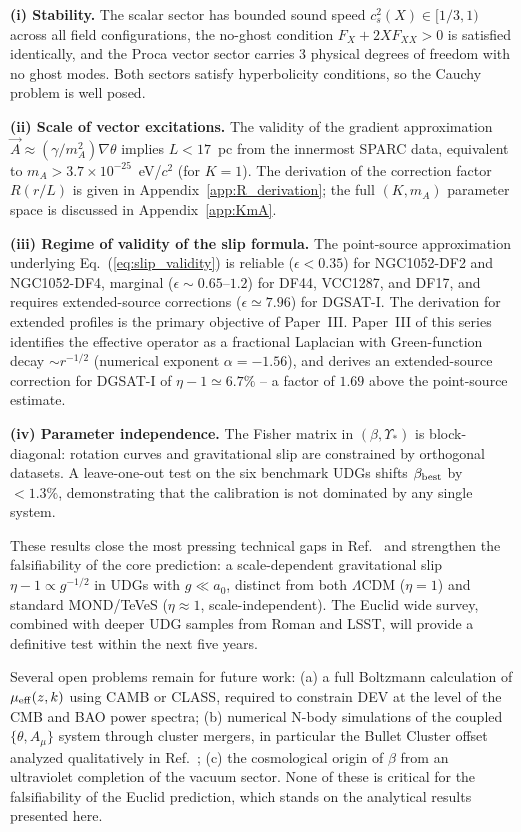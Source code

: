 \documentclass[aps,prd,reprint,floatfix,nofootinbib,superscriptaddress]{revtex4-2}
\newcommand{\aO}{a_0}
\newcommand{\mueff}{\mu_{\rm eff}}
\newcommand{\cs}{c_s}
\begin{document}
\textbf{(i) Stability.} The scalar sector has bounded sound speed
$\cs^2(X) \in [1/3,1)$ across all field configurations, the
no-ghost condition $F_X + 2X F_{XX} > 0$ is satisfied identically,
and the Proca vector sector carries 3 physical degrees of freedom
with no ghost modes. Both sectors satisfy hyperbolicity
conditions, so the Cauchy problem is well posed.

\textbf{(ii) Scale of vector excitations.} The validity of the
gradient approximation $\vec{A}\approx(\gamma/m_A^2)\nabla\theta$
implies $L<17$~pc from the innermost SPARC data, equivalent to
$m_A > 3.7\times10^{-25}$~eV/$c^2$ (for $K=1$). The derivation
of the correction factor $R(r/L)$ is given in Appendix~\ref{app:R_derivation};
the full $(K,m_A)$ parameter space is discussed in
Appendix~\ref{app:KmA}.

\textbf{(iii) Regime of validity of the slip formula.} The
point-source approximation underlying Eq.~(\ref{eq:slip_validity})
is reliable ($\epsilon < 0.35$) for NGC1052-DF2 and NGC1052-DF4,
marginal ($\epsilon \sim 0.65$--$1.2$) for DF44, VCC1287, and DF17,
and requires extended-source corrections ($\epsilon \simeq 7.96$) for
DGSAT-I. The derivation for extended profiles is the primary
objective of Paper~III.
Paper~III of this series identifies the effective operator
as a fractional Laplacian with Green-function decay
$\sim r^{-1/2}$ (numerical exponent $\alpha = -1.56$), and
derives an extended-source correction for DGSAT-I of
$\eta-1 \simeq 6.7\%$ -- a factor of $1.69$ above the
point-source estimate.

\textbf{(iv) Parameter independence.} The Fisher matrix in
$(\beta,\Upsilon_*)$ is block-diagonal: rotation curves and
gravitational slip are constrained by orthogonal datasets. A
leave-one-out test on the six benchmark UDGs shifts
$\beta_{\rm best}$ by $<1.3\%$, demonstrating that the calibration
is not dominated by any single system.

These results close the most pressing technical gaps in
Ref.~\cite{Mendes2026} and strengthen the falsifiability of the
core prediction: a scale-dependent gravitational slip
$\eta-1 \propto g^{-1/2}$ in UDGs with $g\ll\aO$, distinct from
both $\Lambda$CDM ($\eta=1$) and standard MOND/TeVeS
($\eta\approx 1$, scale-independent). The Euclid wide survey,
combined with deeper UDG samples from Roman and LSST, will provide
a definitive test within the next five years.

Several open problems remain for future work: (a) a full
Boltzmann calculation of $\mueff(z,k)$ using CAMB or CLASS,
required to constrain DEV at the level of the CMB and BAO
power spectra; (b) numerical N-body simulations of the coupled
$\{\theta,A_\mu\}$ system through cluster mergers, in particular
the Bullet Cluster offset analyzed qualitatively in
Ref.~\cite{Mendes2026}; (c) the cosmological origin of $\beta$
from an ultraviolet completion of the vacuum sector. None of
these is critical for the falsifiability of the Euclid prediction,
which stands on the analytical results presented here.
\end{document}
